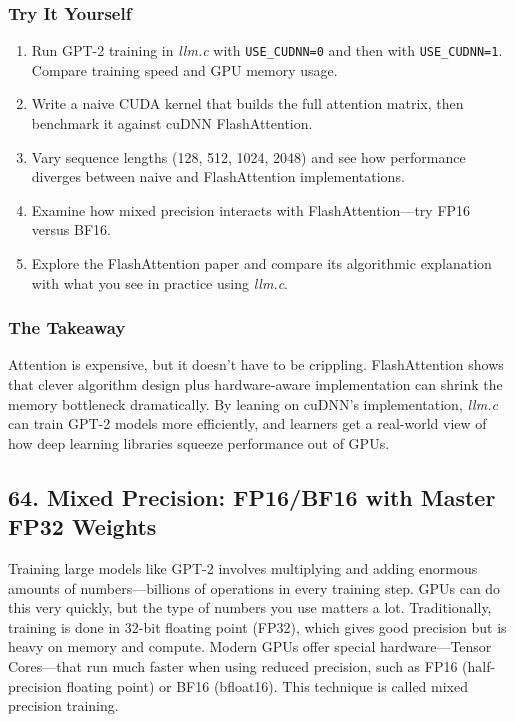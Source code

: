 \documentclass[
  letterpaper,
  DIV=11,
  numbers=noendperiod]{scrreprt}
\providecommand{\tightlist}{%
  \setlength{\itemsep}{0pt}\setlength{\parskip}{0pt}}
\begin{document}
\subsubsection{Try It Yourself}\label{try-it-yourself-51}

\begin{enumerate}
\def\labelenumi{\arabic{enumi}.}
\tightlist
\item
  Run GPT-2 training in \emph{llm.c} with \texttt{USE\_CUDNN=0} and then
  with \texttt{USE\_CUDNN=1}. Compare training speed and GPU memory
  usage.
\item
  Write a naive CUDA kernel that builds the full attention matrix, then
  benchmark it against cuDNN FlashAttention.
\item
  Vary sequence lengths (128, 512, 1024, 2048) and see how performance
  diverges between naive and FlashAttention implementations.
\item
  Examine how mixed precision interacts with FlashAttention---try FP16
  versus BF16.
\item
  Explore the FlashAttention paper and compare its algorithmic
  explanation with what you see in practice using \emph{llm.c}.
\end{enumerate}

\subsubsection{The Takeaway}\label{the-takeaway-52}

Attention is expensive, but it doesn't have to be crippling.
FlashAttention shows that clever algorithm design plus hardware-aware
implementation can shrink the memory bottleneck dramatically. By leaning
on cuDNN's implementation, \emph{llm.c} can train GPT-2 models more
efficiently, and learners get a real-world view of how deep learning
libraries squeeze performance out of GPUs.

\subsection{64. Mixed Precision: FP16/BF16 with Master FP32
Weights}\label{mixed-precision-fp16bf16-with-master-fp32-weights}

Training large models like GPT-2 involves multiplying and adding
enormous amounts of numbers---billions of operations in every training
step. GPUs can do this very quickly, but the type of numbers you use
matters a lot. Traditionally, training is done in 32-bit floating point
(FP32), which gives good precision but is heavy on memory and compute.
Modern GPUs offer special hardware---Tensor Cores---that run much faster
when using reduced precision, such as FP16 (half-precision floating
point) or BF16 (bfloat16). This technique is called mixed precision
training.
\end{document}

